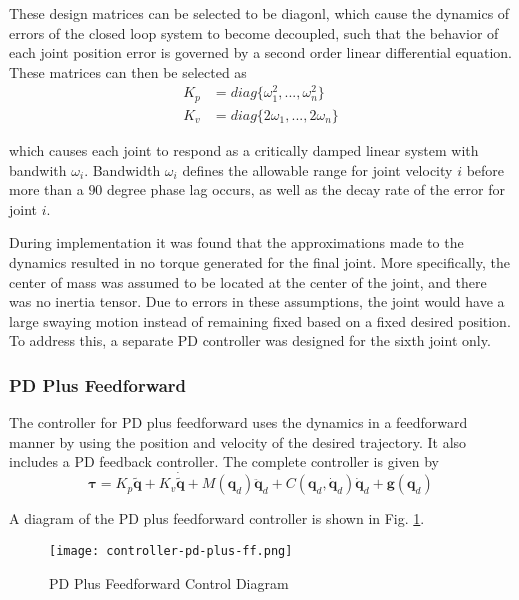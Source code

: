 \documentclass[conference]{IEEEtran}
\begin{document}
These design matrices can be selected to be diagonl, which cause the
dynamics of errors of the closed loop system to become decoupled, such that the
behavior of each joint position error is governed by a second order linear
differential equation. These matrices can then be selected as
\begin{align*}
  K_p &= diag\{\omega_1^2, ... , \omega_n^2\} \\
  K_v &= diag\{2\omega_1, ... , 2\omega_n\}
\end{align*}

which causes each joint to respond as a critically damped linear system with
bandwith $\omega_i$. Bandwidth $\omega_i$ defines the allowable range for joint
velocity $i$ before more than a $90$ degree phase lag occurs, as well as the
decay rate of the error for joint $i$.

During implementation it was found that the approximations made to the dynamics
resulted in no torque generated for the final joint. More specifically, the
center of mass was assumed to be located at the center of the joint, and there
was no inertia tensor. Due to errors in these assumptions, the joint would have
a large swaying motion instead of remaining fixed based on a fixed desired
position. To address this, a separate PD controller was designed for the sixth
joint only.

\subsubsection{PD Plus Feedforward}
The controller for PD plus feedforward uses the dynamics in a feedforward manner
by using the position and velocity of the desired trajectory. It also includes a
PD feedback controller. The complete controller is given by
\begin{equation*}
  \boldsymbol{\tau} = K_p \tilde{\boldsymbol{q}} + K_v \dot{\tilde{\boldsymbol{q}}} + M(\boldsymbol{q}_d)\ddot{\boldsymbol{q}}_d +  C(\boldsymbol{q}_d, \dot{\boldsymbol{q}}_d)\dot{\boldsymbol{q}}_d + \boldsymbol{g}(\boldsymbol{q}_d)
\end{equation*}

A diagram of the PD plus feedforward controller is shown in
Fig. \ref{fig:pd-plus-ff}.

\begin{figure}[!t]
  \texttt{[image: controller-pd-plus-ff.png]}
  \caption{PD Plus Feedforward Control Diagram}
  \label{fig:pd-plus-ff}
\end{figure}
\end{document}
